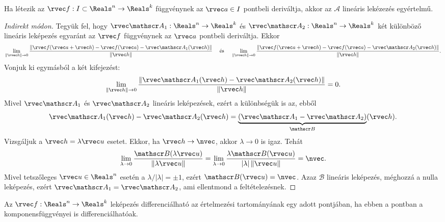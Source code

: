 \begin{statement}
  Ha létezik az $\rvec f: I \subset \Reals^n \to \Reals^k$ függvénynek az
  $\rvec a \in I$ pontbeli deriváltja, akkor az $\mathscr A$ lineáris lekézezés
  egyértelmű.

  \begin{proof}[Indirekt módon]
    Tegyük fel, hogy $\rvec \mathscr A_1: \Reals^n \to \Reals^k$ és
    $\rvec \mathscr A_2: \Reals^n \to \Reals^k$ két különböző lineáris leképezés
    egyaránt az $\rvec f$ függvénynek az $\rvec a$ pontbeli deriváltja. Ekkor
    $$
      \lim_{\|\rvec h\| \to 0} \frac{
        \|\rvec f(\rvec a + \rvec h) - \rvec f(\rvec a) - \rvec \mathscr A_1(\rvec h)\|
      }{
        \|\rvec h\|
      }
      \quad\text{ és }\quad
      \lim_{\|\rvec h\| \to 0} \frac{
        \|\rvec f(\rvec a + \rvec h) - \rvec f(\rvec a) - \rvec \mathscr A_2(\rvec h)\|
      }{
        \|\rvec h\|
      }
      \text.
    $$
    Vonjuk ki egymásból a két kifejezést:
    $$
      \lim_{\|\rvec h\| \to 0} \frac{
        \|\rvec \mathscr A_1(\rvec h) - \rvec \mathscr A_2(\rvec h)\|
      }{
        \|\rvec h\|
      }
      = 0
      \text.
    $$
    Mivel $\rvec \mathscr A_1$ és $\rvec \mathscr A_2$ lineáris leképezések,
    ezért a különbségük is az, ebből
    $$
      \rvec \mathscr A_1(\rvec h) - \rvec \mathscr A_2(\rvec h)
      = \underbrace{(\rvec \mathscr A_1 - \rvec \mathscr A_2)}_{\mathscr B}(\rvec h)
      \text.
    $$
    Vizsgáljuk a $\rvec h = \lambda \rvec u$ esetet. Ekkor, ha
    $\rvec h \to \nvec$, akkor $\lambda \to 0$ is igaz. Tehát
    $$
      \lim_{\lambda \to 0} \frac{\mathscr B(\lambda \rvec u)}{\|\lambda \rvec u\|}
      = \lim_{\lambda \to 0} \frac{\lambda \mathscr B(\rvec u)}{|\lambda| \, \|\rvec u\|}
      = \nvec
      \text.
    $$
    Mivel tetszőleges $\rvec u \in \Reals^n$ esetén a
    $\lambda / |\lambda| = \pm 1$, ezért $\mathscr B(\rvec u) = \nvec$.
    Azaz $\mathscr B$ lineáris leképezés, méghozzá a nulla leképezés, ezért
    $\rvec \mathscr A_1 = \rvec \mathscr A_2$, ami ellentmond a feltételezésnek.
  \end{proof}
\end{statement}

\begin{definition}
  Az $\rvec f: \Reals^n \to \Reals^k$ leképezés differenciálható az értelmezési
  tartományának egy adott pontjában, ha ebben a pontban a komponensfüggvényei
  is differenciálhatóak.
\end{definition}

